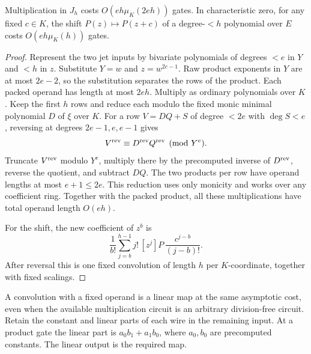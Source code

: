 \begin{lemma}\label{poly:lem:descent-jet-cost}
Multiplication in $J_h$ costs $O(eh\mu_{K}(2eh))$ gates.
In characteristic zero, for any fixed $c\in K$, the shift $P(z)\mapsto P(z+c)$ of a
degree-$<h$ polynomial over $E$ costs $O(eh\mu_{K}(h))$ gates.
\end{lemma}
\begin{proof}
Represent the two jet inputs by bivariate polynomials of degrees $<e$
in $Y$ and $<h$ in $z$. Substitute $Y=w$ and $z=w^{2e-1}$. Raw product
exponents in $Y$ are at most $2e-2$, so the substitution separates the
rows of the product. Each packed operand has length at most $2eh$.
Multiply as ordinary polynomials over $K$. Keep the first $h$ rows and reduce each modulo the fixed monic minimal
polynomial $D$ of $\xi$ over $K$. For a row $V=DQ+S$ of degree $<2e$
with $\deg S<e$, reversing at degrees $2e-1,e,e-1$ gives
\begin{equation}\label{poly:eq:reciprocal-reduction}
  V^{\rm rev}\equiv D^{\rm rev}Q^{\rm rev}\pmod {Y^e}.
\end{equation}
Truncate $V^{\rm rev}$ modulo $Y^e$, multiply there by the precomputed
inverse of $D^{\rm rev}$, reverse the quotient, and subtract $DQ$. The two products per row
have operand lengths at most $e+1\le2e$. This reduction uses only
monicity and works over any coefficient ring. Together with the packed
product, all these multiplications have total operand length $O(eh)$.

For the shift, the new coefficient of $z^b$ is
\[
  \frac1{b!}\sum_{j=b}^{h-1} j!\,[z^j]P\,
                             \frac{c^{j-b}}{(j-b)!}.
\]
After reversal this is one fixed convolution of length $h$ per
$K$-coordinate, together with fixed scalings.
\end{proof}

A convolution with a fixed operand is a linear map at the same
asymptotic cost, even when the available multiplication circuit is an
arbitrary division-free circuit. Retain the constant and linear parts
of each wire in the remaining input. At a product gate the linear part
is $a_0b_1+a_1b_0$, where $a_0,b_0$ are precomputed constants.
The linear output is the required map.

